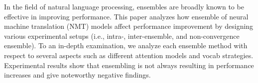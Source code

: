 In the field of natural language processing, ensembles are broadly known to be effective in improving performance. This paper analyzes how ensemble of neural machine translation (NMT) models affect performance improvement by designing various experimental setups (i.e., intra-, inter-ensemble, and non-convergence ensemble). To an in-depth examination, we analyze each ensemble method with respect to several aspects such as different attention models and vocab strategies. Experimental results show that ensembling is not always resulting in performance increases and give noteworthy negative findings.
